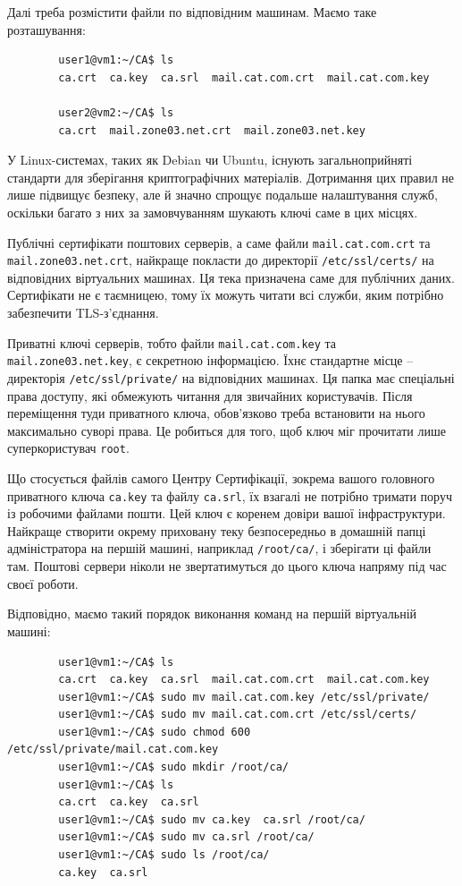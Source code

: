 \documentclass[14pt, a4paper]{extreport}
\begin{document}
	Далі треба розмістити файли по відповідним машинам. Маємо таке розташування:
	
	\begin{verbatim}
		user1@vm1:~/CA$ ls
		ca.crt  ca.key  ca.srl  mail.cat.com.crt  mail.cat.com.key
		
		user2@vm2:~/CA$ ls
		ca.crt  mail.zone03.net.crt  mail.zone03.net.key
	\end{verbatim}
	
	У Linux-системах, таких як Debian чи Ubuntu, існують загальноприйняті стандарти для зберігання криптографічних матеріалів. Дотримання цих правил не лише підвищує безпеку, але й значно спрощує подальше налаштування служб, оскільки багато з них за замовчуванням шукають ключі саме в цих місцях.
	
	Публічні сертифікати поштових серверів, а саме файли \texttt{mail.cat.com.crt} та \texttt{mail.zone03.net.crt}, найкраще покласти до директорії \texttt{/etc/ssl/certs/} на відповідних віртуальних машинах. Ця тека призначена саме для публічних даних. Сертифікати не є таємницею, тому їх можуть читати всі служби, яким потрібно забезпечити TLS-з'єднання.
	
	Приватні ключі серверів, тобто файли \texttt{mail.cat.com.key} та \texttt{mail.zone03.net.key}, є секретною інформацією. Їхнє стандартне місце -- директорія \texttt{/etc/ssl/private/} на відповідних машинах. Ця папка має спеціальні права доступу, які обмежують читання для звичайних користувачів. Після переміщення туди приватного ключа, обов'язково треба встановити на нього максимально суворі права. Це робиться для того, щоб ключ міг прочитати лише суперкористувач \texttt{root}.
	
	Що стосується файлів самого Центру Сертифікації, зокрема вашого головного приватного ключа \texttt{ca.key} та файлу \texttt{ca.srl}, їх взагалі не потрібно тримати поруч із робочими файлами пошти. Цей ключ є коренем довіри вашої інфраструктури. Найкраще створити окрему приховану теку безпосередньо в домашній папці адміністратора на першій машині, наприклад \texttt{/root/ca/}, і зберігати ці файли там. Поштові сервери ніколи не звертатимуться до цього ключа напряму під час своєї роботи.
	
	Відповідно, маємо такий порядок виконання команд на першій віртуальній машині:
	
	\begin{verbatim}
		user1@vm1:~/CA$ ls
		ca.crt  ca.key  ca.srl  mail.cat.com.crt  mail.cat.com.key
		user1@vm1:~/CA$ sudo mv mail.cat.com.key /etc/ssl/private/
		user1@vm1:~/CA$ sudo mv mail.cat.com.crt /etc/ssl/certs/
		user1@vm1:~/CA$ sudo chmod 600 /etc/ssl/private/mail.cat.com.key
		user1@vm1:~/CA$ sudo mkdir /root/ca/
		user1@vm1:~/CA$ ls
		ca.crt  ca.key  ca.srl
		user1@vm1:~/CA$ sudo mv ca.key  ca.srl /root/ca/
		user1@vm1:~/CA$ sudo mv ca.srl /root/ca/
		user1@vm1:~/CA$ sudo ls /root/ca/
		ca.key  ca.srl
	\end{verbatim}
	
\end{document}
